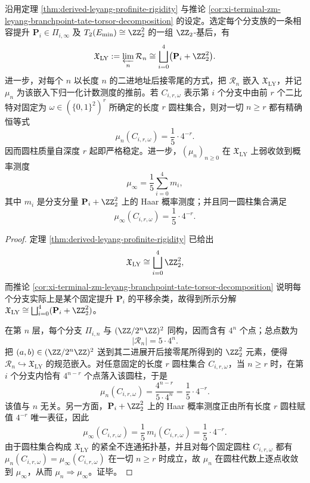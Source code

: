 \begin{theorem}\label{thm:derived-leyang-branchset-haar-limit}
沿用定理 \ref{thm:derived-leyang-profinite-rigidity} 与推论 \ref{cor:xi-terminal-zm-leyang-branchpoint-tate-torsor-decomposition} 的设定。选定每个分支族的一条相容提升 \(\mathbf P_i\in\Pi_{i,\infty}\) 及 \(T_2(E_{\min})\cong\ZZ_2^2\) 的一组 \(\ZZ_2\)-基后，有
\[
\mathfrak X_{\mathrm{LY}}
:=
\varprojlim_n \mathcal R_n
\cong
\bigsqcup_{i=0}^{4}\bigl(\mathbf P_i+\ZZ_2^2\bigr).
\]
进一步，对每个 \(n\) 以长度 \(n\) 的二进地址后接零尾的方式，把 \(\mathcal R_n\) 嵌入 \(\mathfrak X_{\mathrm{LY}}\)，并记 \(\mu_n\) 为该嵌入下归一化计数测度的推前。若 \(C_{i,r,\omega}\) 表示第 \(i\) 个分支中由前 \(r\) 个二比特对固定为 \(\omega\in(\{0,1\}^2)^r\) 所确定的长度 \(r\) 圆柱集合，则对一切 \(n\ge r\) 都有精确恒等式
\[
\mu_n(C_{i,r,\omega})=\frac{1}{5}\cdot 4^{-r}.
\]
因而圆柱质量自深度 \(r\) 起即严格稳定。进一步，\((\mu_n)_{n\ge 0}\) 在 \(\mathfrak X_{\mathrm{LY}}\) 上弱收敛到概率测度
\[
\mu_\infty
=
\frac{1}{5}\sum_{i=0}^{4} m_i,
\]
其中 \(m_i\) 是分支分量 \(\mathbf P_i+\ZZ_2^2\) 上的 Haar 概率测度；并且同一圆柱集合满足
\[
\mu_\infty(C_{i,r,\omega})=\frac{1}{5}\cdot 4^{-r}.
\]
\end{theorem}

\begin{proof}
定理 \ref{thm:derived-leyang-profinite-rigidity} 已给出
\[
\mathfrak X_{\mathrm{LY}}
\cong
\bigsqcup_{i=0}^{4}\ZZ_2^2,
\]
而推论 \ref{cor:xi-terminal-zm-leyang-branchpoint-tate-torsor-decomposition} 说明每个分支实际上是某个固定提升 \(\mathbf P_i\) 的平移余类，故得到所示分解
\(
\mathfrak X_{\mathrm{LY}}\cong\bigsqcup_{i=0}^{4}(\mathbf P_i+\ZZ_2^2)
\)。

在第 \(n\) 层，每个分支 \(\Pi_{i,n}\) 与 \((\ZZ/2^n\ZZ)^2\) 同构，因而含有 \(4^n\) 个点；总点数为
\[
|\mathcal R_n|=5\cdot 4^n.
\]
把 \((a,b)\in(\ZZ/2^n\ZZ)^2\) 送到其二进展开后接零尾所得到的 \(\ZZ_2^2\) 元素，便得 \(\mathcal R_n\hookrightarrow\mathfrak X_{\mathrm{LY}}\) 的规范嵌入。对任意固定的长度 \(r\) 圆柱集合 \(C_{i,r,\omega}\)，当 \(n\ge r\) 时，在第 \(i\) 个分支内恰有 \(4^{n-r}\) 个点落入该圆柱，于是
\[
\mu_n(C_{i,r,\omega})
=
\frac{4^{n-r}}{5\cdot 4^n}
=
\frac{1}{5}\cdot 4^{-r}.
\]
该值与 \(n\) 无关。另一方面，\(\mathbf P_i+\ZZ_2^2\) 上的 Haar 概率测度正由所有长度 \(r\) 圆柱赋值 \(4^{-r}\) 唯一表征，因此
\[
\mu_\infty(C_{i,r,\omega})
=
\frac{1}{5}\,m_i(C_{i,r,\omega})
=
\frac{1}{5}\cdot 4^{-r}.
\]
由于圆柱集合构成 \(\mathfrak X_{\mathrm{LY}}\) 的紧全不连通拓扑基，并且对每个固定圆柱 \(C_{i,r,\omega}\) 都有
\(
\mu_n(C_{i,r,\omega})=\mu_\infty(C_{i,r,\omega})
\)
在一切 \(n\ge r\) 时成立，故 \(\mu_n\) 在圆柱代数上逐点收敛到 \(\mu_\infty\)，从而 \(\mu_n\Rightarrow\mu_\infty\)。证毕。
\end{proof}


